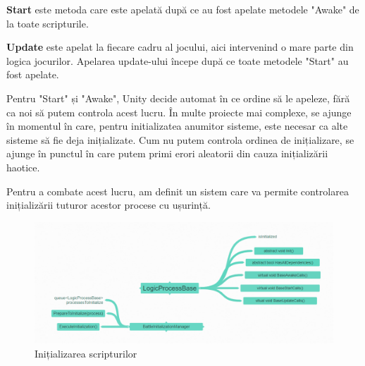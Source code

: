 \documentclass[12pt, a4paper]{article}
\begin{document}
	\textbf{Start} este metoda care este apelată după ce au fost apelate metodele "Awake" de la toate scripturile.
	\newline
	
	\textbf{Update} este apelat la fiecare cadru al jocului, aici intervenind o mare parte din logica jocurilor. Apelarea update-ului începe după ce toate metodele "Start" au fost apelate.
	\newline
	
	Pentru "Start" și "Awake", Unity decide automat în ce ordine să le apeleze, fără ca noi să putem controla acest lucru. În multe proiecte mai complexe, se ajunge în momentul în care, pentru initializatea anumitor sisteme, este necesar ca alte sisteme să fie deja inițializate. Cum nu putem controla ordinea de inițializare, se ajunge în punctul în care putem primi erori aleatorii din cauza inițializării haotice.
	\newline
	
	Pentru a combate acest lucru, am definit un sistem care va permite controlarea inițializării tuturor acestor procese cu ușurință.
	
	\begin{figure}[H]
		\centering
		\includegraphics[width=1\textwidth]{logicProcessCoggle.png}
		\caption{Inițializarea scripturilor}
		\label{fig: logicProcessCoggle}
	\end{figure}
	
\end{document}
